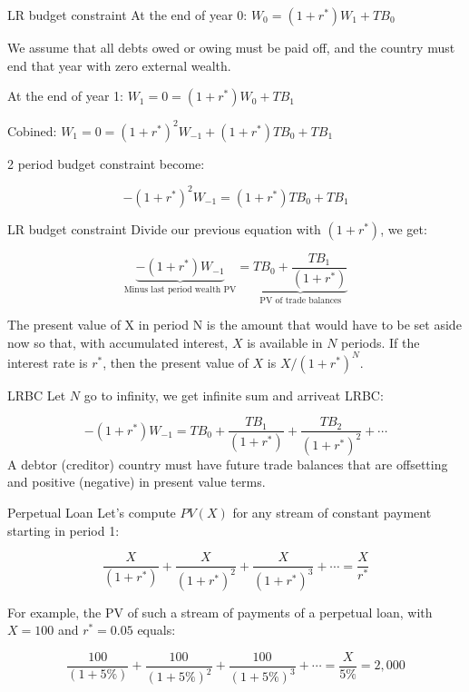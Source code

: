 \documentclass[
  ignorenonframetext,
]{beamer}
\begin{document}
\begin{frame}{LR budget constraint}
\label{lr-budget-constraint}
At the end of year 0: \(W_0=(1+r^*)W_1+TB_0\)

We assume that all debts owed or owing must be paid off, and the country
must end that year with zero external wealth.

At the end of year 1: \(W_1=0=(1+r^*)W_0+TB_1\)

Cobined: \(W_1=0=(1+r^*)^2W_{-1}+(1+r^*)TB_0+TB_1\)

2 period budget constraint become:

\[
-(1+r^*)^2W_{-1}=(1+r^*)TB_0+TB_1
\]
\end{frame}

\begin{frame}{LR budget constraint}
\label{lr-budget-constraint-1}
Divide our previous equation with \((1+r^*)\), we get:

\[
\underbrace{-(1+r^*)W_{-1}}_{\text{Minus last period wealth PV}}=\underbrace{TB_0+\frac{TB_1}{(1+r^*)}}_{\text{PV of trade balances}}
\]

The present value of X in period N is the amount that would have to be
set aside now so that, with accumulated interest, \(X\) is available in
\(N\) periods. If the interest rate is \(r^*\), then the present value
of \(X\) is \(X/(1 + r^*)^N\).
\end{frame}

\begin{frame}{LRBC}
\label{lrbc}
Let \(N\) go to infinity, we get infinite sum and arriveat LRBC:

\[
-(1+r^*)W_{-1}=TB_0+\frac{TB_1}{(1+r^*)}+\frac{TB_2}{(1+r^*)^2}+\cdots
\] A debtor (creditor) country must have future trade balances that are
offsetting and positive (negative) in present value terms.
\end{frame}

\begin{frame}{Perpetual Loan}
\label{perpetual-loan}
Let's compute \(PV(X)\) for any stream of constant payment starting in
period 1:

\[
\frac{X}{(1+r^*)}+\frac{X}{(1+r^*)^2}+\frac{X}{(1+r^*)^3}+\cdots=\frac{X}{r^*}
\]

For example, the PV of such a stream of payments of a perpetual loan,
with \(X=100\) and \(r^*=0.05\) equals:

\[
\frac{100}{(1+5\%)}+\frac{100}{(1+5\%)^2}+\frac{100}{(1+5\%)^3}+\cdots=\frac{X}{5\%}=2,000
\]
\end{frame}
\end{document}
